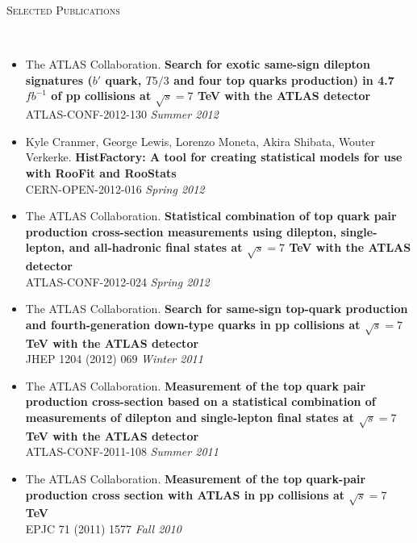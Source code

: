 \documentclass[9pt]{article}
\newenvironment{changemargin}[2]{%
  \begin{list}{}{%
    \setlength{\topsep}{0pt}%
    \setlength{\leftmargin}{#1}%
    \setlength{\rightmargin}{#2}%
    \setlength{\listparindent}{\parindent}%
    \setlength{\itemindent}{\parindent}%
    \setlength{\parsep}{\parskip}%
  }%
  \item[]}{\end{list}
}
\newcommand{\lineover}{
	\begin{changemargin}{-0.05in}{-0.05in}
		\vspace*{-8pt}
		\hrulefill \\
		\vspace*{-2pt}
	\end{changemargin}
}
\newcommand{\header}[1]{
	\begin{changemargin}{-0.5in}{-0.5in}
		\scshape{#1}\\
  	\lineover
	\end{changemargin}
}
\newenvironment{body} {
	\vspace*{-16pt}
	\begin{changemargin}{-0.25in}{-0.5in}
  }	
	{\end{changemargin}
}
\begin{document}
\smallskip



\header{Selected Publications}

\begin{body}
  \vspace{14pt}
  \begin{itemize}
  \item The ATLAS Collaboration. \textbf{Search for exotic same-sign dilepton signatures ($b'$ quark, $T5/3$ and four top quarks production) in 4.7 $fb^{-1}$ of pp collisions at $\sqrt{s}=7$ TeV with the ATLAS detector} \\
    ATLAS-CONF-2012-130  \hfill \emph{Summer 2012} \\
    \medskip
  \item Kyle Cranmer, George Lewis, Lorenzo Moneta, Akira Shibata, Wouter Verkerke. \textbf{HistFactory: A tool for creating statistical models for use with RooFit and RooStats} \\
    CERN-OPEN-2012-016 \hfill \emph{Spring 2012} \\
    \medskip
  \item The ATLAS Collaboration.  \textbf{Statistical combination of top quark pair production cross-section measurements using dilepton, single-lepton, and all-hadronic final states at $\sqrt{s}=7$ TeV with the ATLAS detector} \\
    ATLAS-CONF-2012-024 \hfill \emph{Spring 2012} \\
    \medskip
  \item The ATLAS Collaboration. \textbf{Search for same-sign top-quark production and fourth-generation down-type quarks in pp collisions at $\sqrt{s}=7$ TeV with the ATLAS detector} \\ 
    JHEP 1204 (2012) 069 \hfill \emph{Winter 2011} \\
    \medskip
  \item The ATLAS Collaboration.  \textbf{Measurement of the top quark pair production cross-section based on a statistical combination of measurements of dilepton and single-lepton final states at $\sqrt{s}=7$ TeV with the ATLAS detector} \\
    ATLAS-CONF-2011-108 \hfill \emph{Summer 2011} \\
    \medskip
    \item The ATLAS Collaboration. \textbf{Measurement of the top quark-pair production cross section with ATLAS in pp collisions at $\sqrt{s}=7$ TeV} \\
      EPJC 71 (2011) 1577 \hfill \emph{Fall 2010} \\


\end{itemize}
\end{body}
\end{document}
